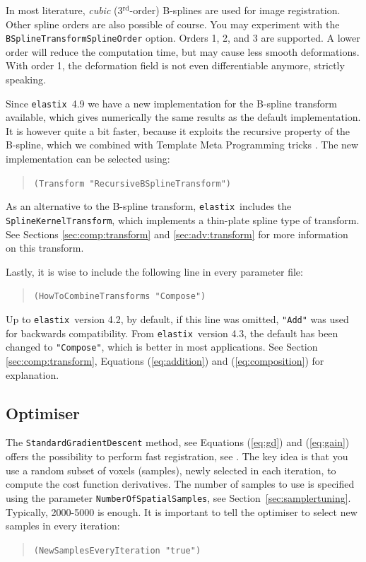 \documentclass[]{report}
\newcommand{\elastix}{\texttt{elastix}}
\begin{document}
In most literature, \emph{cubic} (3$^\text{rd}$-order) B-splines are used for
image registration. Other spline orders are also possible of course. You may
experiment with the \texttt{BSplineTransformSplineOrder} option. Orders 1, 2,
and 3 are supported. A lower order will reduce the computation time, but may
cause less smooth deformations. With order 1, the deformation field is not even
differentiable anymore, strictly speaking.

Since \elastix\ 4.9 we have a new implementation for the B-spline
transform available, which gives numerically the same results as the
default implementation. It is however quite a bit faster, because it
exploits the recursive property of the B-spline, which we combined
with Template Meta Programming tricks \cite{Huizinga2014}. The new
implementation can be selected using:
\begin{quote}
  \texttt{(Transform "RecursiveBSplineTransform")}
\end{quote}

As an alternative to the B-spline transform, \elastix\ includes the
\texttt{SplineKernelTransform}, which implements a thin-plate spline type of
transform. See Sections \ref{sec:comp:transform} and \ref{sec:adv:transform}
for more information on this transform.

Lastly, it is wise to include the following line in every
parameter file:
\begin{quote}
  \texttt{(HowToCombineTransforms "Compose")}
\end{quote}
Up to \elastix\ version 4.2, by default, if this line was omitted,
\texttt{"Add"} was used for backwards compatibility. From \elastix\ version
4.3, the default has been changed to \texttt{"Compose"}, which is better in
most applications. See Section \ref{sec:comp:transform}, Equations
(\ref{eq:addition}) and (\ref{eq:composition}) for explanation.

\subsection{Optimiser}\label{sec:optimizertuning}

The \texttt{StandardGradientDescent} method, see Equations
(\ref{eq:gd}) and (\ref{eq:gain}) offers the possibility to
perform fast registration, see \cite{KleinEA07}. The key idea is
that you use a random subset of voxels (samples), newly selected
in each iteration, to compute the cost function derivatives. The
number of samples to use is specified using the parameter
\texttt{NumberOfSpatialSamples}, see
Section~\ref{sec:samplertuning}. Typically, 2000-5000 is enough.
It is important to tell the optimiser to select new samples in
every iteration:
\begin{quote}
  \texttt{(NewSamplesEveryIteration "true")}
\end{quote}
\end{document}
